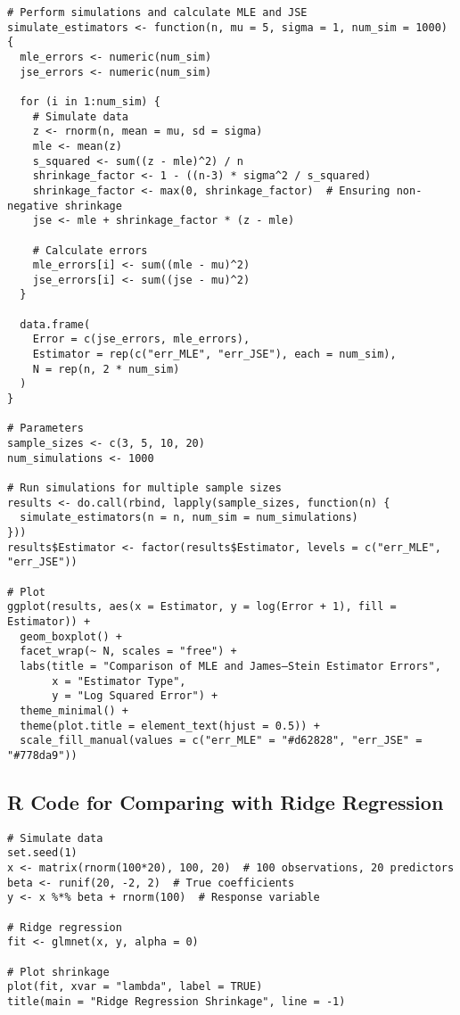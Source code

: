 \begin{verbatim}
# Perform simulations and calculate MLE and JSE
simulate_estimators <- function(n, mu = 5, sigma = 1, num_sim = 1000) {
  mle_errors <- numeric(num_sim)
  jse_errors <- numeric(num_sim)
  
  for (i in 1:num_sim) {
    # Simulate data
    z <- rnorm(n, mean = mu, sd = sigma)
    mle <- mean(z)
    s_squared <- sum((z - mle)^2) / n
    shrinkage_factor <- 1 - ((n-3) * sigma^2 / s_squared)
    shrinkage_factor <- max(0, shrinkage_factor)  # Ensuring non-negative shrinkage
    jse <- mle + shrinkage_factor * (z - mle)
    
    # Calculate errors
    mle_errors[i] <- sum((mle - mu)^2)
    jse_errors[i] <- sum((jse - mu)^2)
  }
  
  data.frame(
    Error = c(jse_errors, mle_errors),
    Estimator = rep(c("err_MLE", "err_JSE"), each = num_sim),
    N = rep(n, 2 * num_sim)
  )
}

# Parameters
sample_sizes <- c(3, 5, 10, 20)
num_simulations <- 1000

# Run simulations for multiple sample sizes
results <- do.call(rbind, lapply(sample_sizes, function(n) {
  simulate_estimators(n = n, num_sim = num_simulations)
}))
results$Estimator <- factor(results$Estimator, levels = c("err_MLE", "err_JSE"))

# Plot
ggplot(results, aes(x = Estimator, y = log(Error + 1), fill = Estimator)) +
  geom_boxplot() +
  facet_wrap(~ N, scales = "free") +
  labs(title = "Comparison of MLE and James–Stein Estimator Errors",
       x = "Estimator Type",
       y = "Log Squared Error") +
  theme_minimal() +
  theme(plot.title = element_text(hjust = 0.5)) +
  scale_fill_manual(values = c("err_MLE" = "#d62828", "err_JSE" = "#778da9"))
\end{verbatim}

\subsection{R Code for Comparing with Ridge Regression}

\begin{verbatim}
# Simulate data
set.seed(1)
x <- matrix(rnorm(100*20), 100, 20)  # 100 observations, 20 predictors
beta <- runif(20, -2, 2)  # True coefficients
y <- x %*% beta + rnorm(100)  # Response variable

# Ridge regression
fit <- glmnet(x, y, alpha = 0)

# Plot shrinkage
plot(fit, xvar = "lambda", label = TRUE)
title(main = "Ridge Regression Shrinkage", line = -1)
\end{verbatim}